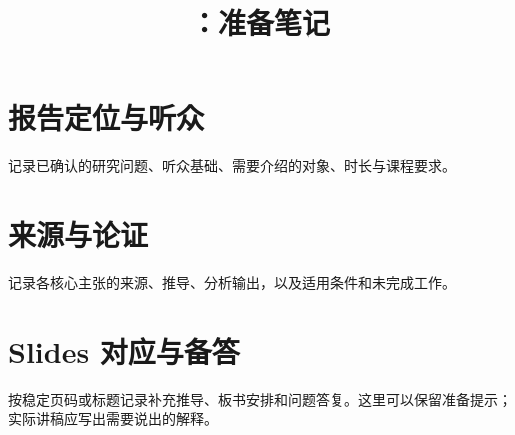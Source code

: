 \documentclass[UTF8,12pt,fontset=fandol]{ctexart}
\title{\ReportShortTitle：准备笔记}
\author{\ReportPresenter}
\date{}
\begin{document}
\maketitle
\section*{报告定位与听众}
记录已确认的研究问题、听众基础、需要介绍的对象、时长与课程要求。
\section*{来源与论证}
记录各核心主张的来源、推导、分析输出，以及适用条件和未完成工作。
\section*{Slides 对应与备答}
按稳定页码或标题记录补充推导、板书安排和问题答复。这里可以保留准备提示；实际讲稿应写出需要说出的解释。
\end{document}
